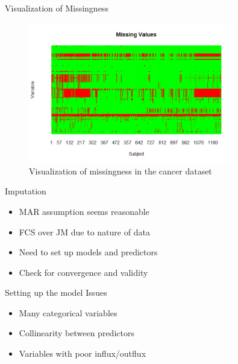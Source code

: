 \begin{frame}{Visualization of Missingness}
 \begin{figure}[h!]
  \centering
    \includegraphics[width=0.8\textwidth]{missingvalues_plot.png}
  \caption{Visualization of missingness in the cancer dataset}
\label{fig:missingplot}

\end{figure}
\end{frame}

\begin{frame}{Imputation}
 \begin{itemize}
  \item MAR assumption seems reasonable
  \item FCS over JM due to nature of data
  \item Need to set up models and predictors
  \item Check for convergence and validity
 \end{itemize}

\end{frame}

\begin{frame}{Setting up the model}
Issues
\begin{itemize}
 \item Many categorical variables 
 \item Collinearity between predictors
 \item Variables with poor influx/outflux \cite{VanBuuren2012}
\end{itemize}

 
\end{frame}


